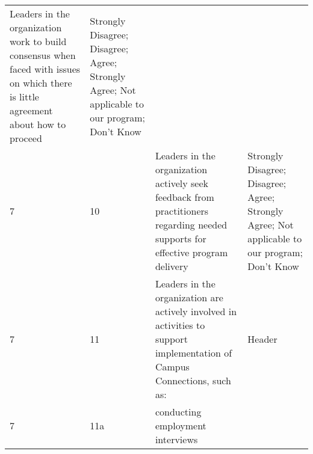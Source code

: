 \documentclass[]{article}
\begin{document}
\begin{longtable}[]{@{}llll@{}}
\begin{minipage}[t]{0.41\columnwidth}
Leaders in the organization work to build consensus when faced with
issues on which there is little agreement about how to proceed\strut
\end{minipage} & \begin{minipage}[t]{0.39\columnwidth}\raggedright\strut
Strongly Disagree; Disagree; Agree; Strongly Agree; Not applicable to
our program; Don't Know\strut
\end{minipage}\tabularnewline
\begin{minipage}[t]{0.05\columnwidth}\raggedright\strut
7\strut
\end{minipage} & \begin{minipage}[t]{0.04\columnwidth}\raggedright\strut
10\strut
\end{minipage} & \begin{minipage}[t]{0.41\columnwidth}\raggedright\strut
Leaders in the organization actively seek feedback from practitioners
regarding needed supports for effective program delivery\strut
\end{minipage} & \begin{minipage}[t]{0.39\columnwidth}\raggedright\strut
Strongly Disagree; Disagree; Agree; Strongly Agree; Not applicable to
our program; Don't Know\strut
\end{minipage}\tabularnewline
\begin{minipage}[t]{0.05\columnwidth}\raggedright\strut
7\strut
\end{minipage} & \begin{minipage}[t]{0.04\columnwidth}\raggedright\strut
11\strut
\end{minipage} & \begin{minipage}[t]{0.41\columnwidth}\raggedright\strut
Leaders in the organization are actively involved in activities to
support implementation of Campus Connections, such as:\strut
\end{minipage} & \begin{minipage}[t]{0.39\columnwidth}\raggedright\strut
Header\strut
\end{minipage}\tabularnewline
\begin{minipage}[t]{0.05\columnwidth}\raggedright\strut
7\strut
\end{minipage} & \begin{minipage}[t]{0.04\columnwidth}\raggedright\strut
11a\strut
\end{minipage} & \begin{minipage}[t]{0.41\columnwidth}\raggedright\strut
conducting employment interviews\strut
\end{minipage} & \begin{minipage}[t]{0.39\columnwidth}\raggedright\strut

\end{minipage}
\end{longtable}
\end{document}
